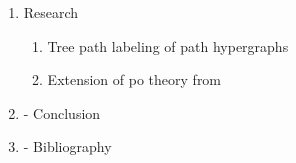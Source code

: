 \documentclass[MS,]{iitmdiss}
\begin{document}
\begin{enumerate}[{Chapter} 1]
\item Research %
  \begin{enumerate}[{Section 4.}1]
  \item Tree path labeling of path
    hypergraphs%
  \item Extension of po theory from \cite{nsnrs09}
  \end{enumerate}

\item - Conclusion

\item - Bibliography

\end{enumerate}



\end{document}

